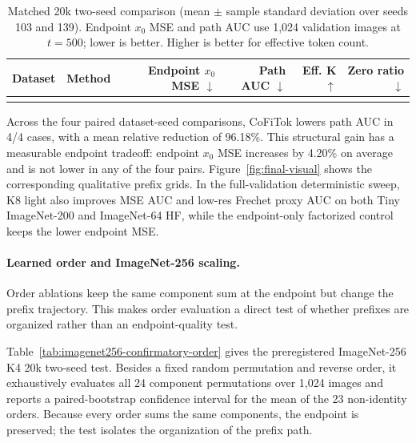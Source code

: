 \documentclass[letterpaper]{article}
\newcommand{\method}{CoFiTok}
\begin{document}
\begin{table}[t]
  \centering
  \caption{Matched 20k two-seed comparison (mean $\pm$ sample standard
  deviation over seeds 103 and 139). Endpoint $x_0$ MSE and path AUC use
  1,024 validation images at $t=500$; lower is better. Higher is better for
  effective token count.}
  \label{tab:fair20k}
  \small
  \begin{tabular}{llrrrr}
    \toprule
    Dataset & Method & Endpoint $x_0$ MSE $\downarrow$ & Path AUC $\downarrow$ & Eff. K $\uparrow$ & Zero ratio $\downarrow$ \\
    \midrule
    \\
    \bottomrule
  \end{tabular}
\end{table}

Across the four paired dataset-seed comparisons, \method{} lowers path AUC in
4/4 cases, with a mean relative reduction of 96.18\%. This structural gain has
a measurable endpoint tradeoff: endpoint $x_0$ MSE increases by 4.20\% on average and
is not lower in any of the four pairs. Figure~\ref{fig:final-visual} shows the
corresponding qualitative prefix grids.
In the full-validation deterministic sweep, K8 light also improves MSE AUC and
low-res Frechet proxy AUC on both Tiny ImageNet-200 and ImageNet-64 HF, while
the endpoint-only factorized control keeps the lower endpoint MSE.

\paragraph{Learned order and ImageNet-256 scaling.}

Order ablations keep the same component sum at the endpoint but change the
prefix trajectory. This makes order evaluation a direct test of whether prefixes
are organized rather than an endpoint-quality test.

Table~\ref{tab:imagenet256-confirmatory-order} gives the preregistered
ImageNet-256 K4 20k two-seed test. Besides a fixed random permutation and
reverse order, it exhaustively evaluates all 24 component permutations over
1,024 images and reports a paired-bootstrap confidence interval for the mean of
the 23 non-identity orders. Because every order sums the same components, the
endpoint is preserved; the test isolates the organization of the prefix path.
\end{document}

